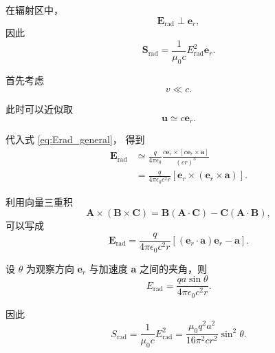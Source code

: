 在辐射区中，
\begin{equation}
    \boldsymbol E_{\mathrm{rad}}
    \perp\boldsymbol{e}_r,
\end{equation}
因此
\begin{equation}
    \boldsymbol S_{\mathrm{rad}}
    =
    \frac{1}{\mu_0c}
    E_{\mathrm{rad}}^2\boldsymbol{e}_r.
    \label{eq:Srad_general}
\end{equation}

首先考虑
\begin{equation}
    v\ll c.
\end{equation}

此时可以近似取
\begin{equation}
    \boldsymbol u\simeq c\boldsymbol{e}_r.
\end{equation}

代入式 \eqref{eq:Erad_general}，
得到
\begin{align}
    \boldsymbol E_{\mathrm{rad}}
    &\simeq
    \frac{q}{4\pi\epsilon_0}
    \frac{
        c\boldsymbol{e}_r
        \times
        \left[
            c\boldsymbol{e}_r\times\boldsymbol a
        \right]
    }
    {(cr)^3}
    \\
    &=
    \frac{q}{4\pi\epsilon_0c^2r}
    \left[
        \boldsymbol{e}_r
        \times
        \left(
            \boldsymbol{e}_r\times\boldsymbol a
        \right)
    \right].
\end{align}

利用向量三重积
\begin{equation}
    \boldsymbol A\times
    (\boldsymbol B\times\boldsymbol C)
    =
    \boldsymbol B(\boldsymbol A\cdot\boldsymbol C)
    -
    \boldsymbol C(\boldsymbol A\cdot\boldsymbol B),
\end{equation}
可以写成
\begin{equation}
    \boxed{
    \boldsymbol E_{\mathrm{rad}}
    =
    \frac{q}{4\pi\epsilon_0c^2r}
    \left[
        (\boldsymbol{e}_r\cdot\boldsymbol a)\boldsymbol{e}_r
        -
        \boldsymbol a
    \right]
    }.
\end{equation}

设 $\theta$ 为观察方向 $\boldsymbol{e}_r$
与加速度 $\boldsymbol a$ 之间的夹角，则
\begin{equation}
    E_{\mathrm{rad}}
    =
    \frac{qa\sin\theta}
    {4\pi\epsilon_0c^2r}.
\end{equation}

因此
\begin{equation}
    S_{\mathrm{rad}}
    =
    \frac{1}{\mu_0c}
    E_{\mathrm{rad}}^2
    =
    \frac{\mu_0q^2a^2}
    {16\pi^2cr^2}
    \sin^2\theta.
\end{equation}

